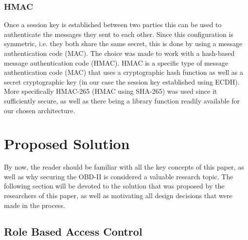 \documentclass[master=cws,masteroption=vs,english]{kulemt}
\begin{document}
\subsubsection{HMAC} Once a session key is established between two parties this can be used to authenticate the messages they sent to each other. Since this configuration is symmetric, i.e. they both share the same secret, this is done by using a message authentication code (MAC). The choice was made to work with a hash-based message authentication code (HMAC). HMAC is a specific type of message authentication code (MAC) that uses a cryptographic hash function as well as a secret cryptographic key (in our case the session key established using ECDH). More specifically HMAC-265 (HMAC using SHA-265) was used since it sufficiently secure, as well as there being a library function readily available for our chosen architecture.


\section{Proposed Solution}
\label{sec:solution}

By now, the reader should be familiar with all the key concepts of this paper, as well as why securing the OBD-II is considered a valuable research topic. The following section will be devoted to the solution that was proposed by the researchers of this paper, as well as motivating all design decisions that were made in the process.

\subsection{Role Based Access Control}
\label{sec:sol_RBAC}
\end{document}
